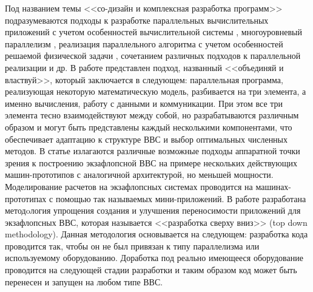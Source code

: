 Под названием темы <<со-дизайн и комплексная разработка программ>> подразумеваются подходы к разработке параллельных 
вычислительных приложений с учетом особенностей вычислительной системы \cite{Poghosyan2015167}, 
многоуровневый параллелизм \cite{Jacobsen20131,Liu2011261}, реализация параллельного алгоритма с учетом особенностей решаемой физической задачи \cite{Rycerz20131116}, 
сочетанием различных подходов к параллельной реализации \cite{Chakroun20131563,Jin2011562} и др.      
В работе \cite{Emad2016} представлен подход, названный <<объединяй и властвуй>>, который заключается в следующем: параллельная программа, реализующая некоторую математическую модель, разбивается на три элемента, а именно вычисления, работу с данными и коммуникации. При этом все три элемента тесно взаимодействуют между собой, но  разрабатываются различным образом и могут быть представлены каждый несколькими компонентами, что обеспечивает адаптацию к структуре ВВС и выбор оптимальных численных методов. 
В статье \cite{Dosanjh2014} излагаются различные возможные подходы аппаратной точки зрения к построению экзафлопсной ВВС на примере нескольких действующих машин-прототипов с аналогичной архитектурой, но меньшей мощности. Моделирование расчетов на экзафлопсных системах проводится на машинах-прототипах с помощью так называемых мини-приложений. 
В работе \cite{Subotic2013450} разработана методoлогия упрощения создания и улучшения переносимости приложений для экзафлопсных ВВС, которая называется <<разработка сверху вниз>> (top down methodology). Данная методология основывается на следующем: разработка кода проводится так, чтобы он не был привязан к типу параллелизма или используемому оборудованию. Доработка под реально имеющееся оборудование  проводится на следующей стадии разработки и таким образом код может быть перенесен и запущен на любом типе ВВС.




